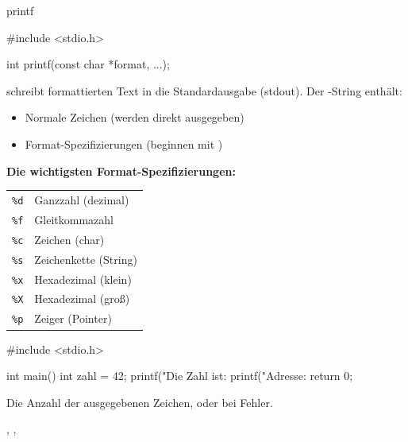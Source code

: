 \begin{man}{printf}
    \begin{synopsis}
        \begin{plaincode}[gobble=8]
            #include <stdio.h>

            int printf(const char *format, ...);
        \end{plaincode}
    \end{synopsis}

    \begin{desc}
         schreibt formattierten Text in die Standardausgabe (stdout). Der -String enthält:
        \begin{itemize}
            \item Normale Zeichen (werden direkt ausgegeben)
            \item Format-Spezifizierungen (beginnen mit \codeinline{\%})
        \end{itemize}

        \textbf{Die wichtigsten Format-Spezifizierungen:}

        \begin{tabular}{ll}
        \texttt{\%d} & Ganzzahl (dezimal) \\
        \texttt{\%f} & Gleitkommazahl \\
        \texttt{\%c} & Zeichen (char) \\
        \texttt{\%s} & Zeichenkette (String) \\
        \texttt{\%x} & Hexadezimal (klein) \\
        \texttt{\%X} & Hexadezimal (groß) \\
        \texttt{\%p} & Zeiger (Pointer) \\
        \end{tabular}
    \end{desc}

    \begin{example}
        \begin{code}
#include <stdio.h>

int main() {
    int zahl = 42;
    printf("Die Zahl ist: %
    printf("Adresse: %
    return 0;
}
        \end{code}
    \end{example}

    \begin{returns}
        Die Anzahl der ausgegebenen Zeichen, oder  bei Fehler.
    \end{returns}

    \begin{seeother}
        , , 
    \end{seeother}
\end{man}

